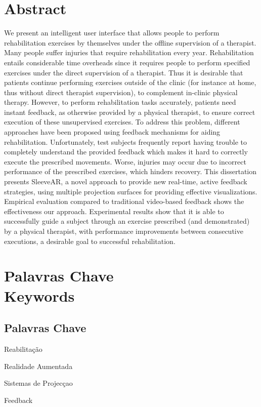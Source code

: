 \chapter*{Abstract}
\thispagestyle{empty}

We present an intelligent user interface that allows people to perform rehabilitation exercises by themselves under the offline supervision of a therapist.  Many people suffer injuries that require rehabilitation every year. Rehabilitation entails considerable time overheads since it requires people to perform specified exercises under the direct supervision of a therapist. Thus it is desirable that patients continue performing exercises outside of the clinic (for instance at home, thus without direct therapist supervision), to complement in-clinic physical therapy.
However, to perform rehabilitation tasks accurately, patients need instant feedback, as otherwise provided by a physical therapist, to ensure correct execution of these unsupervised exercises. 
To address this problem, different approaches have been proposed using feedback mechanisms for aiding rehabilitation. 
Unfortunately, test subjects frequently report having trouble to completely understand the provided feedback which makes it hard to correctly execute the prescribed movements. 
Worse, injuries may occur due to incorrect performance of the prescribed exercises, which hinders recovery. This dissertation presents SleeveAR, a novel approach to provide new real-time, active feedback strategies, using multiple projection surfaces for providing effective visualizations.
Empirical evaluation compared to traditional video-based feedback shows the effectiveness our approach. Experimental results show that it is able to successfully guide a subject through an exercise prescribed (and demonstrated) by a physical therapist, with performance improvements between consecutive executions, a desirable goal to successful rehabilitation.


\newpage


\chapter*{Palavras Chave \\ Keywords}
\thispagestyle{empty}

\section*{Palavras Chave}
{\large %

\noindent Reabilita\c{c}\~ao

\noindent Realidade Aumentada

\noindent Sistemas de Projec\c{c}ao

\noindent Feedback


}

